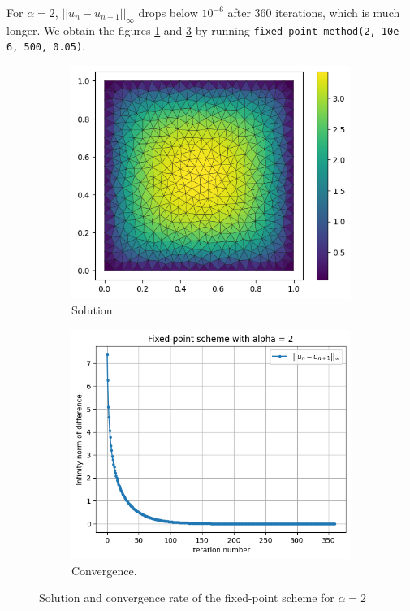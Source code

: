\documentclass[11pt, a4paper, twoside]{article}
\begin{document}

 For $\alpha=2$, $||u_n -u_{n+1}||_\infty$  drops below $10^{-6}$ after 360 iterations, which is much longer. We obtain the figures \ref{q2fig3} and \ref{q2fig4} by running \verb+fixed_point_method(2, 10e-6, 500, 0.05)+.
 
 
\begin{figure}[H]
\begin{subfigure}[h]{0.5\linewidth}
\includegraphics[scale = 0.6]{../Figures/fixed_sol_alpha2.png}
\caption{Solution.}
\label{q2fig3}
\end{subfigure}
\hfill
\begin{subfigure}[h]{0.5\linewidth}
\includegraphics[scale = 0.6]{../Figures/fixed_conv_alpha2.png}
\caption{Convergence.}
\label{q2fig4}
\end{subfigure}%
\caption{Solution and convergence rate of the fixed-point scheme for $\alpha=2$}
\end{figure}
\end{document}
